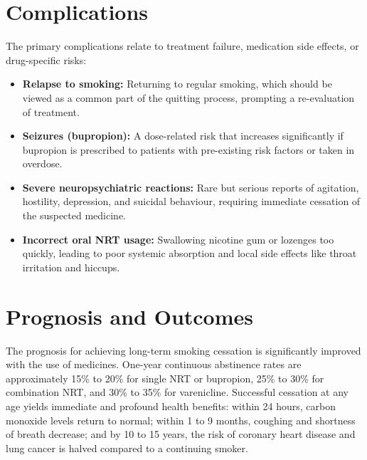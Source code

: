 \section*{Complications}
The primary complications relate to treatment failure, medication side effects, or drug-specific risks:
\begin{itemize}
    \item \textbf{Relapse to smoking:} Returning to regular smoking, which should be viewed as a common part of the quitting process, prompting a re-evaluation of treatment.
    \item \textbf{Seizures (bupropion):} A dose-related risk that increases significantly if bupropion is prescribed to patients with pre-existing risk factors or taken in overdose.
    \item \textbf{Severe neuropsychiatric reactions:} Rare but serious reports of agitation, hostility, depression, and suicidal behaviour, requiring immediate cessation of the suspected medicine.
    \item \textbf{Incorrect oral NRT usage:} Swallowing nicotine gum or lozenges too quickly, leading to poor systemic absorption and local side effects like throat irritation and hiccups.
\end{itemize}

\section*{Prognosis and Outcomes}
The prognosis for achieving long-term smoking cessation is significantly improved with the use of medicines. One-year continuous abstinence rates are approximately 15\% to 20\% for single NRT or bupropion, 25\% to 30\% for combination NRT, and 30\% to 35\% for varenicline. Successful cessation at any age yields immediate and profound health benefits: within 24 hours, carbon monoxide levels return to normal; within 1 to 9 months, coughing and shortness of breath decrease; and by 10 to 15 years, the risk of coronary heart disease and lung cancer is halved compared to a continuing smoker.

